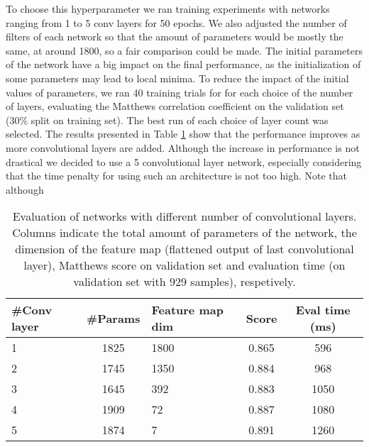         To choose this hyperparameter we ran training experiments with networks ranging from 1 to 5 conv layers for 50 epochs. We also adjusted the number of filters of each network so that the amount of parameters would be mostly the same, at around 1800, so a fair comparison could be made. The initial parameters of the network have a big impact on the final performance, as the initialization of some parameters may lead to local minima. To reduce the impact of the initial values of parameters, we ran 40 training trials for for each choice of the number of layers, evaluating the Matthews correlation coefficient \cite{evaluationMetrics} on the validation set (30\% split on training set). The best run of each choice of layer count was selected. The results presented in Table \ref{table:evalNumberConvLayers} show that the performance improves as more convolutional layers are added. Although the increase in performance is not drastical we decided to use a 5 convolutional layer network, especially considering that the time penalty for using such an architecture is not too high. Note that although

      	\begin{table}
      	 \begin{center}
      	  \label{table:evalNumberConvLayers}
      	  \caption{Evaluation of networks with different number of convolutional layers. Columns indicate the total amount of parameters of the network, the dimension of the feature map (flattened output of last convolutional layer), Matthews score on validation set and evaluation time (on validation set with 929 samples), respetively.}
      	  \begin{tabular}{ | l | c | l | c | c |}
      	    \hline
      	    \#Conv layer & \#Params & Feature map dim & Score & Eval time (ms)   \\ \hline
      	    1            & 1825    &  1800           & 0.865 &  596             \\
      	    2            & 1745    &  1350           & 0.884 &  968             \\
      	    3            & 1645    &  392            & 0.883 &  1050            \\
      	    4            & 1909    &  72             & 0.887 &  1080            \\
      	    5            & 1874    &  7              & 0.891 &  1260            \\ \hline
      		  \end{tabular}
      		\end{center}
      	 \end{table}

